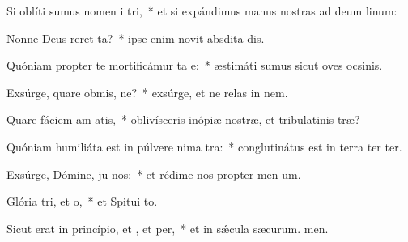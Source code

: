 \item Si oblíti sumus nomen i tri,~* et si expándimus manus nostras ad deum linum:
\item Nonne Deus reret ta?~* ipse enim novit absdita dis.
\item Quóniam propter te mortificámur ta e:~* æstimáti sumus sicut oves ocsinis.
\item Exsúrge, quare obmis, ne?~* exsúrge, et ne relas in nem.
\item Quare fáciem am atis,~* oblivísceris inópiæ nostræ, et tribulatinis træ?
\item Quóniam humiliáta est in púlvere nima tra:~* conglutinátus est in terra ter ter.
\item Exsúrge, Dómine, ju nos:~* et rédime nos propter men um.
\item Glória tri, et o,~* et Spitui to.
\item Sicut erat in princípio, et , et per,~* et in sǽcula sæcurum. men.
